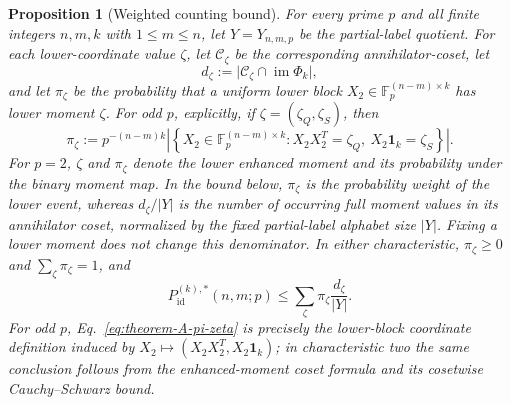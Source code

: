 \documentclass[11pt]{article}
\newcommand{\F}{\mathbb F}
\newcommand{\1}{\mathbf 1}
\theoremstyle{plain}
\newtheorem{proposition}[theorem]{Proposition}
\theoremstyle{definition}
\theoremstyle{remark}
\begin{document}
\begin{proposition}[Weighted counting bound]
\label{prop:converse-weighted-moment-fiber-reduction}
For every prime $p$ and all finite integers $n,m,k$ with $1\le m\le n$, let
$Y=Y_{n,m,p}$ be the partial-label quotient.  For each lower-coordinate value
$\zeta$, let $\mathcal C_{\zeta}$ be the corresponding annihilator-coset,
let
\begin{equation}
 d_{\zeta}:=
 \bigl|\mathcal C_{\zeta}\cap\operatorname{im}\Phi_k\bigr|,
 \label{eq:theorem-A-d-zeta}
\end{equation}
and let $\pi_{\zeta}$ be the probability that a uniform lower block
$X_2\in\F_p^{(n-m)\times k}$ has lower moment $\zeta$.  For odd $p$, explicitly,
if $\zeta=(\zeta_Q,\zeta_S)$, then
\begin{equation}
 \pi_{\zeta}:=
 p^{-(n-m)k}
 \left|\left\{X_2\in\F_p^{(n-m)\times k}:
 X_2X_2^T=\zeta_Q,\ X_2\1_k=\zeta_S\right\}\right|.
 \label{eq:theorem-A-pi-zeta}
\end{equation}
For $p=2$, $\zeta$ and $\pi_{\zeta}$ denote the lower enhanced moment and its
probability under the binary moment map.  In the bound below,
$\pi_{\zeta}$ is the probability weight of the lower event, whereas
$d_{\zeta}/\lvert Y\rvert$ is the number of occurring full moment values in
its annihilator coset, normalized by the fixed partial-label alphabet size
$\lvert Y\rvert$.  Fixing a lower moment does not change this denominator.  In either characteristic,
$\pi_{\zeta}\ge0$ and $\sum_{\zeta}\pi_{\zeta}=1$, and
\begin{equation}
 P_{\mathrm{id}}^{(k),*}(n,m;p)
 \le
 \sum_{\zeta}\pi_{\zeta}\frac{d_{\zeta}}{\lvert Y\rvert}.
 \label{eq:weighted-support-bound}
\end{equation}
For odd $p$, Eq.~\eqref{eq:theorem-A-pi-zeta} is precisely the lower-block
coordinate definition induced by $X_2\mapsto(X_2X_2^T,X_2\1_k)$; in
characteristic two the same conclusion follows from the enhanced-moment
coset formula and its cosetwise Cauchy--Schwarz bound.
\end{proposition}
\end{document}
